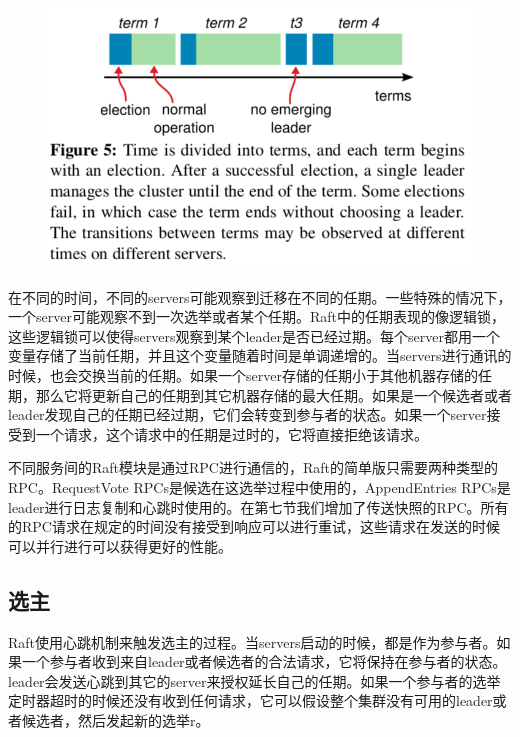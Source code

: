 \documentclass[journal]{IEEEtran}
\begin{document}
\begin{figure}[htbp]
\begin{center}
\includegraphics[width=1\linewidth]{./fig5.png}
\end{center}
\end{figure}

在不同的时间，不同的servers可能观察到迁移在不同的任期。一些特殊的情况下，一个server可能观察不到一次选举或者某个任期。Raft中的任期表现的像逻辑锁，这些逻辑锁可以使得servers观察到某个leader是否已经过期。每个server都用一个变量存储了当前任期，并且这个变量随着时间是单调递增的。当servers进行通讯的时候，也会交换当前的任期。如果一个server存储的任期小于其他机器存储的任期，那么它将更新自己的任期到其它机器存储的最大任期。如果是一个候选者或者leader发现自己的任期已经过期，它们会转变到参与者的状态。如果一个server接受到一个请求，这个请求中的任期是过时的，它将直接拒绝该请求。

不同服务间的Raft模块是通过RPC进行通信的，Raft的简单版只需要两种类型的RPC。RequestVote RPCs是候选在这选举过程中使用的，AppendEntries RPCs是leader进行日志复制和心跳时使用的。在第七节我们增加了传送快照的RPC。所有的RPC请求在规定的时间没有接受到响应可以进行重试，这些请求在发送的时候可以并行进行可以获得更好的性能。

\subsection{选主}
Raft使用心跳机制来触发选主的过程。当servers启动的时候，都是作为参与者。如果一个参与者收到来自leader或者候选者的合法请求，它将保持在参与者的状态。leader会发送心跳到其它的server来授权延长自己的任期。如果一个参与者的选举定时器超时的时候还没有收到任何请求，它可以假设整个集群没有可用的leader或者候选者，然后发起新的选举r。
\end{document}
